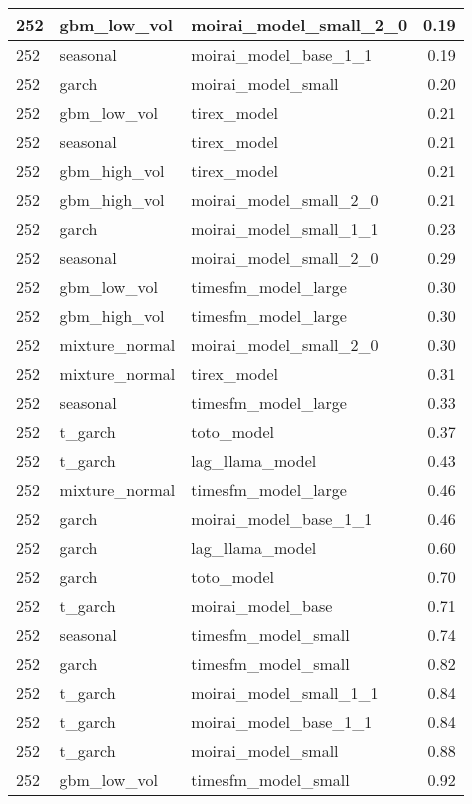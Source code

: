 {\begin{tabular}{lllr}
\midrule
252 & gbm\_low\_vol & moirai\_model\_small\_2\_0 & 0.19 \\
\midrule
252 & seasonal & moirai\_model\_base\_1\_1 & 0.19 \\
\midrule
252 & garch & moirai\_model\_small & 0.20 \\
\midrule
252 & gbm\_low\_vol & tirex\_model & 0.21 \\
\midrule
252 & seasonal & tirex\_model & 0.21 \\
\midrule
252 & gbm\_high\_vol & tirex\_model & 0.21 \\
\midrule
252 & gbm\_high\_vol & moirai\_model\_small\_2\_0 & 0.21 \\
\midrule
252 & garch & moirai\_model\_small\_1\_1 & 0.23 \\
\midrule
252 & seasonal & moirai\_model\_small\_2\_0 & 0.29 \\
\midrule
252 & gbm\_low\_vol & timesfm\_model\_large & 0.30 \\
\midrule
252 & gbm\_high\_vol & timesfm\_model\_large & 0.30 \\
\midrule
252 & mixture\_normal & moirai\_model\_small\_2\_0 & 0.30 \\
\midrule
252 & mixture\_normal & tirex\_model & 0.31 \\
\midrule
252 & seasonal & timesfm\_model\_large & 0.33 \\
\midrule
252 & t\_garch & toto\_model & 0.37 \\
\midrule
252 & t\_garch & lag\_llama\_model & 0.43 \\
\midrule
252 & mixture\_normal & timesfm\_model\_large & 0.46 \\
\midrule
252 & garch & moirai\_model\_base\_1\_1 & 0.46 \\
\midrule
252 & garch & lag\_llama\_model & 0.60 \\
\midrule
252 & garch & toto\_model & 0.70 \\
\midrule
252 & t\_garch & moirai\_model\_base & 0.71 \\
\midrule
252 & seasonal & timesfm\_model\_small & 0.74 \\
\midrule
252 & garch & timesfm\_model\_small & 0.82 \\
\midrule
252 & t\_garch & moirai\_model\_small\_1\_1 & 0.84 \\
\midrule
252 & t\_garch & moirai\_model\_base\_1\_1 & 0.84 \\
\midrule
252 & t\_garch & moirai\_model\_small & 0.88 \\
\midrule
252 & gbm\_low\_vol & timesfm\_model\_small & 0.92 \\

\end{tabular}}
